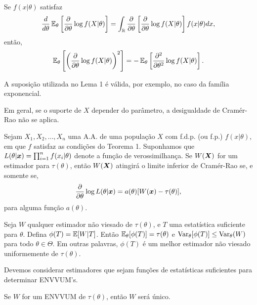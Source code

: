 \begin{theorem}[Lema 1]
	Se $f(x | \theta)$ satisfaz
	\[
	\frac{d}{d\theta} \operatorname{\mathbb{E}}_\theta\left[\frac{\partial}{\partial\theta} \log f(X | \theta)\right] = \int_{\mathbb{R}} \frac{\partial}{\partial\theta}\left[\frac{\partial}{\partial\theta} \log f(X | \theta)\right] f(x | \theta) dx,
	\]
	então,
	\[
	\operatorname{\mathbb{E}}_\theta\left[\left(\frac{\partial}{\partial\theta} \log f(X | \theta)\right)^2\right] = -\operatorname{\mathbb{E}}_\theta\left[\frac{\partial^2}{\partial\theta^2} \log f(X | \theta)\right].
	\]
	
	\begin{note}
		\begin{outline}[enumerate]
			\leavevmode
			\1 A suposição utilizada no Lema 1 é válida, por exemplo, no caso da família exponencial.
			
			\1 Em geral, se o suporte de $X$ depender do parâmetro, a desigualdade de Cramér-Rao não se aplica.
		\end{outline}
	\end{note}
\end{theorem}

\begin{theorem}[Corolário 2]
	Sejam $X_1, X_2, \ldots, X_n$ uma A.A. de uma população $X$ com f.d.p. (ou f.p.) $f(x | \theta)$, em que $f$ satisfaz as condições do Teorema 1. Suponhamos que $L(\theta | \bm{x}) = \prod_{i=1}^{n} f(x_i | \theta)$ denote a função de verossimilhança. Se $W(\bm{X})$ for um estimador para $\tau(\theta)$, então $W(\bm{X})$ atingirá o limite inferior de Cramér-Rao se, e somente se,
	\[
	\frac{\partial}{\partial\theta} \log L(\theta | \bm{x}) = a(\theta)[W(\bm{x}) - \tau(\theta)],
	\]
	para alguma função $a(\theta)$.
\end{theorem}

\begin{theorem}
	Seja $W$ qualquer estimador não viesado de $\tau(\theta)$, e $T$ uma estatística suficiente para $\theta$. Defina $\phi(T) = \operatorname{\mathbb{E}}[W | T]$. Então $\operatorname{\mathbb{E}}_\theta[\phi(T)] = \tau(\theta)$ e $\operatorname{Var}_\theta[\phi(T)] \leq \operatorname{Var}_\theta(W)$ para todo $\theta \in \Theta$. Em outras palavras, $\phi(T)$ é um melhor estimador não viesado uniformemente de $\tau(\theta)$.
	
	\begin{note}
		Devemos considerar estimadores que sejam funções de estatísticas suficientes para determinar ENVVUM's.
	\end{note}
\end{theorem}

\begin{theorem}
	Se $W$ for um ENVVUM de $\tau(\theta)$, então $W$ será único.
\end{theorem}

